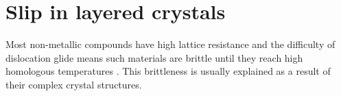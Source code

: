 
\chapter{Slip in layered crystals}

\graphicspath{{Chapter2/Figs/}}


Most non-metallic compounds have high lattice resistance and the difficulty of dislocation glide means such materials are brittle until they reach high homologous temperatures \cite{Walker2010}. This brittleness is usually explained as a result of their complex crystal structures.


